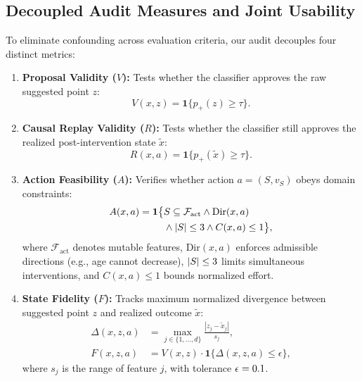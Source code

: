 \documentclass[nolineno]{paper/ieee-access/ieeeaccess}%
\newcommand{\ind}{\ensuremath{\mathbf{1}}}
\begin{document}
\subsection{Decoupled Audit Measures and Joint Usability}
To eliminate confounding across evaluation criteria, our audit decouples four distinct metrics:
\begin{enumerate}
\item \textbf{Proposal Validity ($V$):} Tests whether the classifier approves the raw suggested point $z$:
\begin{equation}
  V(x, z) = \ind\{p_+(z) \ge \tau\}.
  \label{eq:valid}
\end{equation}
\item \textbf{Causal Replay Validity ($R$):} Tests whether the classifier still approves the realized post-intervention state $\widetilde{x}$:
\begin{equation}
  R(x, a) = \ind\{p_+(\widetilde{x}) \ge \tau\}.
  \label{eq:replay_valid}
\end{equation}
\item \textbf{Action Feasibility ($A$):} Verifies whether action $a=(S, v_S)$ obeys domain constraints:
\begin{align}
  A(x, a) = \ind\bigl\{&S \subseteq \mathcal{F}_{\mathrm{act}} \land \mathrm{Dir}(x, a) \nonumber \\
  &\land |S| \le \MaxActions \land C(x, a) \le 1\bigr\},
  \label{eq:feasibility}
\end{align}
where $\mathcal{F}_{\mathrm{act}}$ denotes mutable features, $\mathrm{Dir}(x, a)$ enforces admissible directions (e.g., age cannot decrease), $|S| \le 3$ limits simultaneous interventions, and $C(x, a) \le 1$ bounds normalized effort.
\item \textbf{State Fidelity ($F$):} Tracks maximum normalized divergence between suggested point $z$ and realized outcome $\widetilde{x}$:
\begin{align}
  \Delta(x, z, a) &= \max_{j \in \{1, \dots, d\}} \frac{|z_j - \widetilde{x}_j|}{s_j}, \label{eq:gap} \\
  F(x, z, a) &= V(x, z) \cdot \ind\{\Delta(x, z, a) \le \epsilon\}, \label{eq:fidelity}
\end{align}
where $s_j$ is the range of feature $j$, with tolerance $\epsilon = 0.1$.
\end{enumerate}
\end{document}

